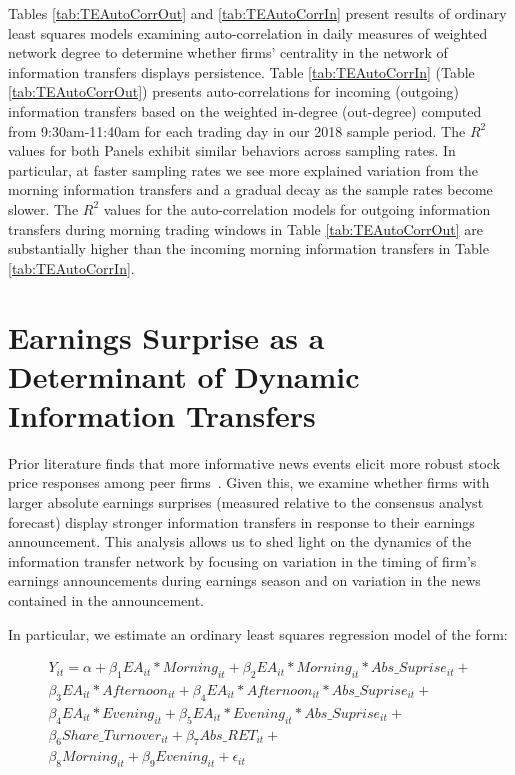 Tables \ref{tab:TEAutoCorrOut} and \ref{tab:TEAutoCorrIn} present results of ordinary least squares models examining auto-correlation in daily measures of weighted network degree to determine whether firms’ centrality in the network of information transfers displays persistence.  Table \ref{tab:TEAutoCorrIn} (Table \ref{tab:TEAutoCorrOut}) presents auto-correlations for incoming (outgoing) information transfers based on the weighted in-degree (out-degree) computed from 9:30am-11:40am for each trading day in our 2018 sample period.  The $R^2$ values for both Panels exhibit similar behaviors across sampling rates. In particular, at faster sampling rates we see more explained variation from the morning information transfers and a gradual decay as the sample rates become slower. The $R^2$ values for the auto-correlation models for outgoing information transfers during morning trading windows in Table \ref{tab:TEAutoCorrOut} are substantially higher than the incoming morning information transfers in Table \ref{tab:TEAutoCorrIn}. 


\section{Earnings Surprise as a Determinant of Dynamic Information Transfers} %


Prior literature finds that more informative news events elicit more robust stock price responses among peer firms~\citep[see][]{Foster1981,  Brochet2018}.  Given this,  we examine whether firms with larger absolute earnings surprises (measured relative to the consensus analyst forecast) display stronger information transfers in response to their earnings announcement.  This analysis allows us to shed light on the dynamics of the information transfer network by focusing on variation in the timing of firm’s earnings announcements during earnings season and on variation in the news contained in the announcement.  

In particular,  we estimate an ordinary least squares regression model of the form:

\setlength{\arraycolsep}{0.0em}
\begin{eqnarray}
Y_{it} = \alpha + \beta_1 EA_{it}  * Morning_{it} + \beta_2 EA_{it}  * Morning_{it} * Abs\_Suprise_{it} + \nonumber\\
\beta_3 EA_{it}  * Afternoon_{it} + \beta_4 EA_{it}  * Afternoon_{it} * Abs\_Suprise_{it} + \nonumber\\
\beta_4 EA_{it}  * Evening_{it} + \beta_5 EA_{it}  * Evening_{it} * Abs\_Suprise_{it} + \nonumber\\
\beta_6 Share\_Turnover_{it} + \beta_7 Abs\_RET_{it} + \nonumber\\
\beta_8 Morning_{it} + \beta_9 Evening_{it} +  \epsilon_{it}
\label{eq:EA-Surprise}
\end{eqnarray}
\setlength{\arraycolsep}{1pt}

